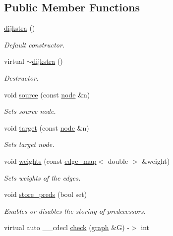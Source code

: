 \subsection*{Public Member Functions}
\begin{DoxyCompactItemize}
\item 
\mbox{\hyperlink{classdijkstra_a64a1fcb9cca32ff932b9b98a08cff106}{dijkstra}} ()
\begin{DoxyCompactList}\small\item\em Default constructor. \end{DoxyCompactList}\item 
virtual \mbox{\hyperlink{classdijkstra_a871e3c8097b7f0bc17358473b1149515}{$\sim$dijkstra}} ()
\begin{DoxyCompactList}\small\item\em Destructor. \end{DoxyCompactList}\item 
void \mbox{\hyperlink{classdijkstra_a9689f2628f76ddb3747ea18c91bd7041}{source}} (const \mbox{\hyperlink{classnode}{node}} \&n)
\begin{DoxyCompactList}\small\item\em Sets source node. \end{DoxyCompactList}\item 
void \mbox{\hyperlink{classdijkstra_a1e9971d767046306574551a461aa2238}{target}} (const \mbox{\hyperlink{classnode}{node}} \&n)
\begin{DoxyCompactList}\small\item\em Sets target node. \end{DoxyCompactList}\item 
void \mbox{\hyperlink{classdijkstra_a92f4394b757f6ffcb372535114a6cbf6}{weights}} (const \mbox{\hyperlink{classedge__map}{edge\+\_\+map}}$<$ double $>$ \&weight)
\begin{DoxyCompactList}\small\item\em Sets weights of the edges. \end{DoxyCompactList}\item 
void \mbox{\hyperlink{classdijkstra_af79383dbbb6b737afcefd8e32350192d}{store\+\_\+preds}} (bool set)
\begin{DoxyCompactList}\small\item\em Enables or disables the storing of predecessors. \end{DoxyCompactList}\item 
virtual auto \+\_\+\+\_\+cdecl \mbox{\hyperlink{classdijkstra_aec2427139f1e69d358153362a99257ba}{check}} (\mbox{\hyperlink{classgraph}{graph}} \&G) -\/$>$ int

\end{DoxyCompactItemize}
